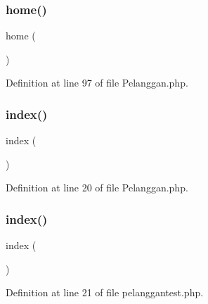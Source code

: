 \mbox{\label{class_pelanggan_a174b8e4c7d4d7363c6f773671defdeff}} 
\subsubsection{\texorpdfstring{home()}{home()}\hspace{0.1cm}{\footnotesize\ttfamily [2/2]}}
{\footnotesize\ttfamily home (\begin{DoxyParamCaption}{ }\end{DoxyParamCaption})}



Definition at line 97 of file Pelanggan.\+php.

\mbox{\label{class_pelanggan_a149eb92716c1084a935e04a8d95f7347}} 
\subsubsection{\texorpdfstring{index()}{index()}\hspace{0.1cm}{\footnotesize\ttfamily [1/2]}}
{\footnotesize\ttfamily index (\begin{DoxyParamCaption}{ }\end{DoxyParamCaption})}



Definition at line 20 of file Pelanggan.\+php.

\mbox{\label{class_pelanggan_a149eb92716c1084a935e04a8d95f7347}} 
\subsubsection{\texorpdfstring{index()}{index()}\hspace{0.1cm}{\footnotesize\ttfamily [2/2]}}
{\footnotesize\ttfamily index (\begin{DoxyParamCaption}{ }\end{DoxyParamCaption})}



Definition at line 21 of file pelanggantest.\+php.

\mbox{\label{class_pelanggan_ad2c26cff98a5f9db6b4dec1edc8ada7b}} 
